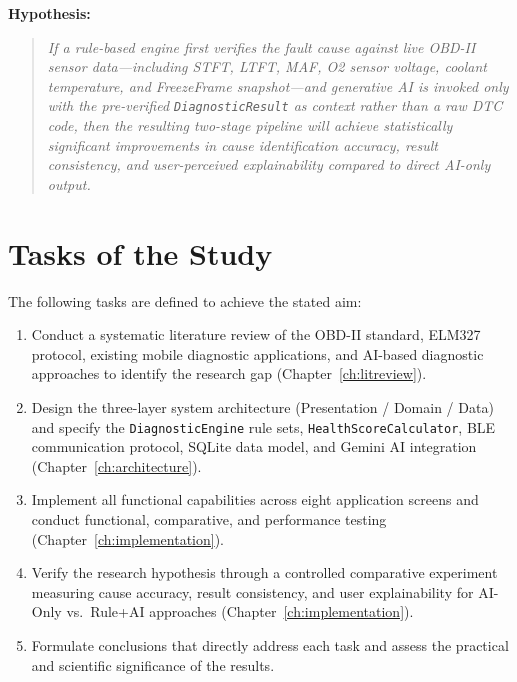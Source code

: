 \textbf{Hypothesis:}
\begin{quote}
\itshape
If a rule-based engine first verifies the fault cause against live OBD-II sensor data---including STFT, LTFT, MAF, O2 sensor voltage, coolant temperature, and FreezeFrame snapshot---and generative AI is invoked only with the pre-verified \texttt{DiagnosticResult} as context rather than a raw DTC code, then the resulting two-stage pipeline will achieve statistically significant improvements in cause identification accuracy, result consistency, and user-perceived explainability compared to direct AI-only output.
\end{quote}

\section*{Tasks of the Study}

The following tasks are defined to achieve the stated aim:

\begin{enumerate}
  \item Conduct a systematic literature review of the OBD-II standard, ELM327 protocol,
        existing mobile diagnostic applications, and AI-based diagnostic approaches
        to identify the research gap (Chapter~\ref{ch:litreview}).
  \item Design the three-layer system architecture (Presentation / Domain / Data) and
        specify the \texttt{DiagnosticEngine} rule sets, \texttt{HealthScoreCalculator},
        BLE communication protocol, SQLite data model, and Gemini AI integration
        (Chapter~\ref{ch:architecture}).
  \item Implement all functional capabilities across eight application screens and
        conduct functional, comparative, and performance testing
        (Chapter~\ref{ch:implementation}).
  \item Verify the research hypothesis through a controlled comparative experiment
        measuring cause accuracy, result consistency, and user explainability for
        AI-Only vs.\ Rule+AI approaches (Chapter~\ref{ch:implementation}).
  \item Formulate conclusions that directly address each task and assess the practical
        and scientific significance of the results.
\end{enumerate}

